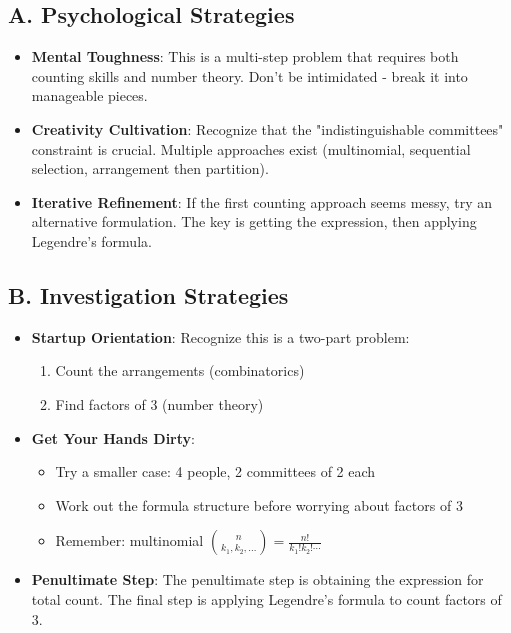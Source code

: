 \documentclass[12pt]{article}
\begin{document}
\begin{strategicbox}
\subsection*{A. Psychological Strategies}
\begin{itemize}[leftmargin=*]
    \item \textbf{Mental Toughness}: This is a multi-step problem that requires both counting skills and number theory. Don't be intimidated - break it into manageable pieces.
    
    \item \textbf{Creativity Cultivation}: Recognize that the "indistinguishable committees" constraint is crucial. Multiple approaches exist (multinomial, sequential selection, arrangement then partition).
    
    \item \textbf{Iterative Refinement}: If the first counting approach seems messy, try an alternative formulation. The key is getting the expression, then applying Legendre's formula.
\end{itemize}

\subsection*{B. Investigation Strategies}
\begin{itemize}[leftmargin=*]
    \item \textbf{Startup Orientation}: Recognize this is a two-part problem:
    \begin{enumerate}
        \item Count the arrangements (combinatorics)
        \item Find factors of 3 (number theory)
    \end{enumerate}
    
    \item \textbf{Get Your Hands Dirty}: 
    \begin{itemize}
        \item Try a smaller case: 4 people, 2 committees of 2 each
        \item Work out the formula structure before worrying about factors of 3
        \item Remember: multinomial $\binom{n}{k_1,k_2,\ldots} = \frac{n!}{k_1!k_2!\cdots}$
    \end{itemize}
    
    \item \textbf{Penultimate Step}: The penultimate step is obtaining the expression for total count. The final step is applying Legendre's formula to count factors of 3.
    

\end{itemize}
\end{strategicbox}
\end{document}
